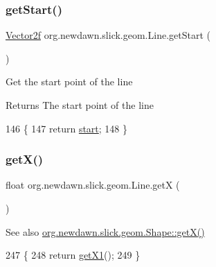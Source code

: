 \subsubsection{\texorpdfstring{get\+Start()}{getStart()}}
{\footnotesize\ttfamily \mbox{\hyperlink{classorg_1_1newdawn_1_1slick_1_1geom_1_1_vector2f}{Vector2f}} org.\+newdawn.\+slick.\+geom.\+Line.\+get\+Start (\begin{DoxyParamCaption}{ }\end{DoxyParamCaption})\hspace{0.3cm}{\ttfamily [inline]}}

Get the start point of the line

\begin{DoxyReturn}{Returns}
The start point of the line 
\end{DoxyReturn}

\begin{DoxyCode}
146                                \{
147         \textcolor{keywordflow}{return} \mbox{\hyperlink{classorg_1_1newdawn_1_1slick_1_1geom_1_1_line_aaf3a6c6053990b96a501b80081258f92}{start}};
148     \}
\end{DoxyCode}
\mbox{\label{classorg_1_1newdawn_1_1slick_1_1geom_1_1_line_a53b6f1c87a3f6f7b3d428cc752863812}} 
\subsubsection{\texorpdfstring{get\+X()}{getX()}}
{\footnotesize\ttfamily float org.\+newdawn.\+slick.\+geom.\+Line.\+getX (\begin{DoxyParamCaption}{ }\end{DoxyParamCaption})\hspace{0.3cm}{\ttfamily [inline]}}

\begin{DoxySeeAlso}{See also}
\mbox{\hyperlink{classorg_1_1newdawn_1_1slick_1_1geom_1_1_shape_a736a47bfdd6f164558b43fd497a3a3f3}{org.\+newdawn.\+slick.\+geom.\+Shape\+::get\+X()}} 
\end{DoxySeeAlso}

\begin{DoxyCode}
247                         \{
248         \textcolor{keywordflow}{return} \mbox{\hyperlink{classorg_1_1newdawn_1_1slick_1_1geom_1_1_line_abebfc0375201e6d648fd559c9c96e6ee}{getX1}}();
249     \}
\end{DoxyCode}
\mbox{\label{classorg_1_1newdawn_1_1slick_1_1geom_1_1_line_abebfc0375201e6d648fd559c9c96e6ee}} 
